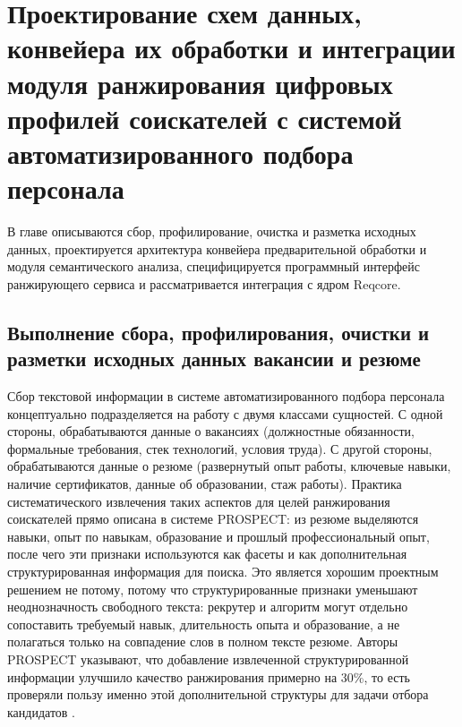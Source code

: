 \chapter{Проектирование схем данных, конвейера их обработки и интеграции модуля ранжирования цифровых профилей соискателей с системой автоматизированного подбора персонала}
\label{chapter:design}

В главе описываются сбор, профилирование, очистка и разметка исходных данных, проектируется архитектура конвейера предварительной обработки и модуля семантического анализа, специфицируется программный интерфейс ранжирующего сервиса и рассматривается интеграция с ядром Reqcore.
\section{Выполнение сбора, профилирования, очистки и разметки исходных данных вакансии и резюме}

Сбор текстовой информации в системе автоматизированного подбора персонала концептуально подразделяется на работу с двумя классами сущностей. С одной стороны, обрабатываются данные о вакансиях (должностные обязанности, формальные требования, стек технологий, условия труда). С другой стороны, обрабатываются данные о резюме (развернутый опыт работы, ключевые навыки, наличие сертификатов, данные об образовании, стаж работы). Практика систематического извлечения таких аспектов для целей ранжирования соискателей прямо описана в системе PROSPECT: из резюме выделяются навыки, опыт по навыкам, образование и прошлый профессиональный опыт, после чего эти признаки используются как фасеты и как дополнительная структурированная информация для поиска. Это является хорошим проектным решением не потому, потому что структурированные признаки уменьшают неоднозначность свободного текста: рекрутер и алгоритм могут отдельно сопоставить требуемый навык, длительность опыта и образование, а не полагаться только на совпадение слов в полном тексте резюме. Авторы PROSPECT указывают, что добавление извлеченной структурированной информации улучшило качество ранжирования примерно на 30\%, то есть проверяли пользу именно этой дополнительной структуры для задачи отбора кандидатов \cite{src03}.

